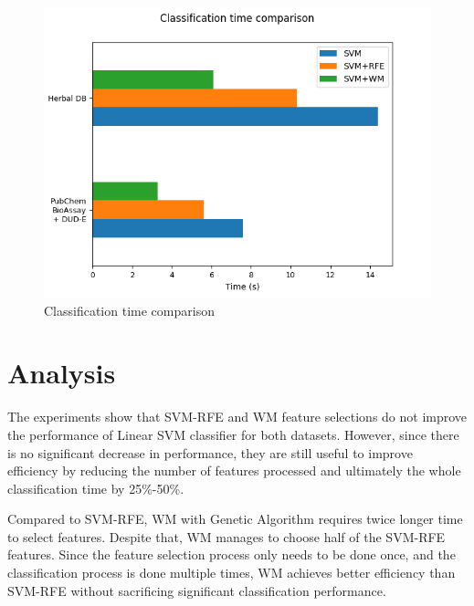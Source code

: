 \documentclass[conference]{IEEEtran}
\begin{document}
\begin{figure}
	\includegraphics[scale=0.4]{../images/classification_time_comparison.png}
	\caption{Classification time comparison}
	\label{fig_classification_time_comparison}
\end{figure}

\section{Analysis}

The experiments show that SVM-RFE and WM feature selections do not improve the performance of Linear SVM classifier for both datasets. However, since there is no significant decrease in performance, they are still useful to improve efficiency by reducing the number of features processed and ultimately the whole classification time by 25\%-50\%.

Compared to SVM-RFE, WM with Genetic Algorithm requires twice longer time to select features. Despite that, WM manages to choose half of the SVM-RFE features. Since the feature selection process only needs to be done once, and the classification process is done multiple times, WM achieves better efficiency than SVM-RFE without sacrificing significant classification performance.
\end{document}
